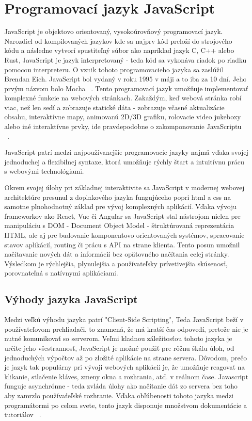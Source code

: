 \section {Programovací jazyk JavaScript}
JavaScript je objektovo orientovaný, vysokoúrovňový programovací jazyk. Narozdiel od kompilovaných jazykov kde
sa najprv kód preloží do strojového kódu a následne vytvorí spustiteľný súbor ako napríklad jazyk C, C++ alebo Rust, JavaScript 
je jazyk interpretovaný - teda kód sa vykonáva riadok po riadku pomocou interpreteru.
O vznik tohoto programovacieho jazyka sa zaslúžil Brendan Eich. JavaScript bol vydaný v roku 1995 v máji a to iba za 
10 dní. Jeho prvým názvom bolo Mocha ~\cite{geeksforgeeks_js}. 
Tento programovací jazyk umožňuje implementovať komplexné funkcie na webových stránkach. Zakaždým, keď webová
stránka robí viac, než len sedí a zobrazuje statické dáta - zobrazuje včasné aktualizácie obsahu, interaktívne mapy,
animovanú 2D/3D grafiku, rolovacie video jukeboxy alebo iné interaktívne prvky, ide pravdepodobne o zakomponovanie JavaScriptu ~\cite{mdn_js}. 

JavaScript patrí medzi najpoužívanejšie programovacie jazyky najmä vďaka svojej jednoduchej a flexibilnej syntaxe, ktorá umožňuje rýchly štart 
a intuitívnu prácu s webovými technológiami.

Okrem svojej úlohy pri základnej interaktivite sa JavaScript v modernej webovej architektúre presunul z doplnkového jazyka fungujúceho popri 
html a css na samotne plnohodnotný základ pre vývoj komplexných aplikácií. Vďaka vývoju frameworkov ako React, Vue či Angular sa JavaScript 
stal nástrojom nielen pre manipuláciu s DOM - Document Object Model - štruktúrovaná reprezentácia HTML, ale aj pre budovanie komponentovo 
orientovaných systémov, spracovanie stavov aplikácií, routing či prácu s API na strane klienta. Tento posun umožnil načítavanie nových
dát a informácií bez opätovného načítania celej stránky. Výsledkom je rýchlejšia, plynulejšia a používateľsky prívetivejšia skúsenosť, 
porovnateľná s natívnymi aplikáciami.

\subsection{Výhody jazyka JavaScript}
Medzi veľkú výhodu jazyka patrí "Client-Side Scripting", Teda JavaScript beží v používateľovom prehliadači, to znamená, že má kratší čas 
odpovedí, pretože nie je nutné komunikovať so serverom. Veľmi kladnou záležitosťou tohoto jazyka je určite jeho všestrannosť,
JavaScript je možné použiť pre rôžnu škálu úloh, od jednoduchých výpočtov až po zložité aplikácie na strane servera. Dôvodom, prečo je jazyk tak 
populárny pri vývoji webových aplikácií je, že umožňuje reagovať na klikanie, stlačenie kláves, zmeny okna a rozhrania, atď. v reálnom čase.
Javascript funguje asynchrónne - teda zvláda úlohy ako načítanie dát zo servera bez toho aby zamrzlo používaťeľské rozhranie. Vďaka 
obľúbenosti tohoto jazyka medzi programátormi po celom svete, tento jazyk disponuje množstvom dokumentácie a tutoriálov ~\cite{gfg_intro_js}.

